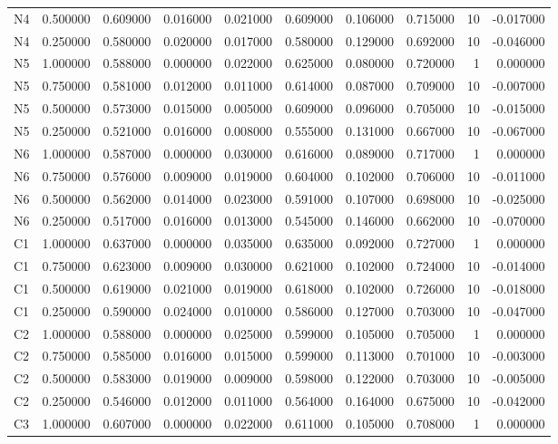 \begin{table}
\begin{tabular}{lrrrrrrrrr}
N4 & 0.500000 & 0.609000 & 0.016000 & 0.021000 & 0.609000 & 0.106000 & 0.715000 & 10 & -0.017000 \\
N4 & 0.250000 & 0.580000 & 0.020000 & 0.017000 & 0.580000 & 0.129000 & 0.692000 & 10 & -0.046000 \\
N5 & 1.000000 & 0.588000 & 0.000000 & 0.022000 & 0.625000 & 0.080000 & 0.720000 & 1 & 0.000000 \\
N5 & 0.750000 & 0.581000 & 0.012000 & 0.011000 & 0.614000 & 0.087000 & 0.709000 & 10 & -0.007000 \\
N5 & 0.500000 & 0.573000 & 0.015000 & 0.005000 & 0.609000 & 0.096000 & 0.705000 & 10 & -0.015000 \\
N5 & 0.250000 & 0.521000 & 0.016000 & 0.008000 & 0.555000 & 0.131000 & 0.667000 & 10 & -0.067000 \\
N6 & 1.000000 & 0.587000 & 0.000000 & 0.030000 & 0.616000 & 0.089000 & 0.717000 & 1 & 0.000000 \\
N6 & 0.750000 & 0.576000 & 0.009000 & 0.019000 & 0.604000 & 0.102000 & 0.706000 & 10 & -0.011000 \\
N6 & 0.500000 & 0.562000 & 0.014000 & 0.023000 & 0.591000 & 0.107000 & 0.698000 & 10 & -0.025000 \\
N6 & 0.250000 & 0.517000 & 0.016000 & 0.013000 & 0.545000 & 0.146000 & 0.662000 & 10 & -0.070000 \\
C1 & 1.000000 & 0.637000 & 0.000000 & 0.035000 & 0.635000 & 0.092000 & 0.727000 & 1 & 0.000000 \\
C1 & 0.750000 & 0.623000 & 0.009000 & 0.030000 & 0.621000 & 0.102000 & 0.724000 & 10 & -0.014000 \\
C1 & 0.500000 & 0.619000 & 0.021000 & 0.019000 & 0.618000 & 0.102000 & 0.726000 & 10 & -0.018000 \\
C1 & 0.250000 & 0.590000 & 0.024000 & 0.010000 & 0.586000 & 0.127000 & 0.703000 & 10 & -0.047000 \\
C2 & 1.000000 & 0.588000 & 0.000000 & 0.025000 & 0.599000 & 0.105000 & 0.705000 & 1 & 0.000000 \\
C2 & 0.750000 & 0.585000 & 0.016000 & 0.015000 & 0.599000 & 0.113000 & 0.701000 & 10 & -0.003000 \\
C2 & 0.500000 & 0.583000 & 0.019000 & 0.009000 & 0.598000 & 0.122000 & 0.703000 & 10 & -0.005000 \\
C2 & 0.250000 & 0.546000 & 0.012000 & 0.011000 & 0.564000 & 0.164000 & 0.675000 & 10 & -0.042000 \\
C3 & 1.000000 & 0.607000 & 0.000000 & 0.022000 & 0.611000 & 0.105000 & 0.708000 & 1 & 0.000000 \\

\end{tabular}
\end{table}
